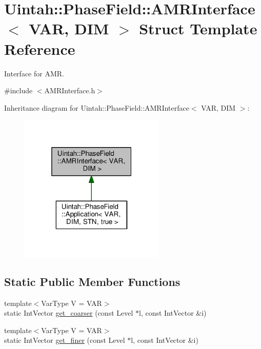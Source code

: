 \hypertarget{structUintah_1_1PhaseField_1_1AMRInterface}{}\section{Uintah\+:\+:Phase\+Field\+:\+:A\+M\+R\+Interface$<$ V\+AR, D\+IM $>$ Struct Template Reference}
\label{structUintah_1_1PhaseField_1_1AMRInterface}


Interface for A\+MR.  




{\ttfamily \#include $<$A\+M\+R\+Interface.\+h$>$}



Inheritance diagram for Uintah\+:\+:Phase\+Field\+:\+:A\+M\+R\+Interface$<$ V\+AR, D\+IM $>$\+:\nopagebreak
\begin{figure}[H]
\begin{center}
\leavevmode
\includegraphics[width=196pt]{structUintah_1_1PhaseField_1_1AMRInterface__inherit__graph}
\end{center}
\end{figure}
\subsection*{Static Public Member Functions}
\begin{DoxyCompactItemize}
\item 
{\footnotesize template$<$Var\+Type V = V\+AR$>$ }\\static Int\+Vector \hyperlink{structUintah_1_1PhaseField_1_1AMRInterface_a567b8c307a636ab6addd2fa4272581a4}{get\+\_\+coarser} (const Level $\ast$l, const Int\+Vector \&i)
\item 
{\footnotesize template$<$Var\+Type V = V\+AR$>$ }\\static Int\+Vector \hyperlink{structUintah_1_1PhaseField_1_1AMRInterface_a5b3ace8289c6b187d6d42c2e19dec9f4}{get\+\_\+finer} (const Level $\ast$l, const Int\+Vector \&i)
\end{DoxyCompactItemize}


